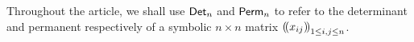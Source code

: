 \begin{remark*} Throughout the article, we shall use $\mathsf{Det}_n$ and $\mathsf{Perm}_n$ to refer to the determinant and permanent respectively of a symbolic $n\times n$ matrix $\left(\!\left(x_{ij}\right)\!\right)_{1\leq i,j\leq n}$. 

\end{remark*}

	
	
	
	

